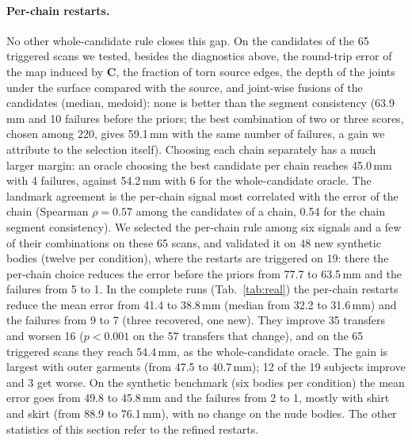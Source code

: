 \documentclass[11pt]{article}
\newcommand{\C}{\mathbf{C}}
\begin{document}
\paragraph{Per-chain restarts.} No other whole-candidate rule closes this gap.
On the candidates of the 65 triggered scans we tested, besides the
diagnostics above, the round-trip error of the map induced by $\C$, the
fraction of torn source edges, the depth of the joints under the surface
compared with the source, and joint-wise fusions of the candidates (median,
medoid): none is better than the segment consistency (63.9\,mm and 10
failures before the priors; the best combination of two or three scores,
chosen among 220, gives 59.1\,mm with the same number of failures, a gain we
attribute to the selection itself). Choosing each chain separately has a
much larger margin: an oracle choosing the best candidate per chain reaches
45.0\,mm with 4 failures, against 54.2\,mm with 6 for the whole-candidate
oracle. The landmark agreement is the per-chain signal most correlated with
the error of the chain (Spearman $\rho = 0.57$ among the candidates of a
chain, 0.54 for the chain segment consistency). We selected the per-chain
rule among six signals and a few of their combinations on these 65 scans,
and validated it on 48 new synthetic bodies (twelve per condition), where the
restarts are triggered on 19: there the per-chain choice reduces the error
before the priors from 77.7 to 63.5\,mm and the failures from 5 to 1.
In the complete runs (Tab.~\ref{tab:real}) the per-chain restarts reduce the
mean error from 41.4 to 38.8\,mm (median from 32.2 to 31.6\,mm) and the
failures from 9 to 7 (three recovered, one new). They improve 35 transfers
and worsen 16 ($p < 0.001$ on the 57 transfers that change), and on the 65
triggered scans they reach 54.4\,mm, as the whole-candidate oracle. The gain
is largest with outer garments (from 47.5 to 40.7\,mm); 12 of the 19 subjects
improve and 3 get worse. On the synthetic benchmark (six bodies per
condition) the mean error goes from 49.8 to 45.8\,mm and the failures from 2
to 1, mostly with shirt and skirt (from 88.9 to 76.1\,mm), with no change on
the nude bodies. The other statistics of this section refer to the refined
restarts.
\end{document}
